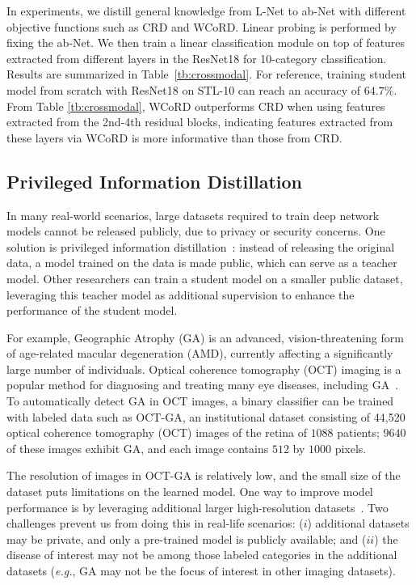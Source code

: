 \documentclass[final]{cvpr}
\theoremstyle{definition}
\begin{document}
In experiments, we distill general knowledge from L-Net to ab-Net with different objective functions such as CRD and WCoRD.
Linear probing is performed by fixing the ab-Net. We then train a linear classification module on top of features extracted from different layers in the ResNet18 for 10-category classification. 
Results are summarized in Table~\ref{tb:crossmodal}. For reference, training student model from scratch with ResNet18 on STL-10 can reach an accuracy of $64.7\%$. 
From Table \ref{tb:crossmodal}, WCoRD outperforms CRD when using features extracted from the 2nd-4th residual blocks, indicating features extracted from these layers via WCoRD is more informative than those from CRD.


\subsection{Privileged Information Distillation}

In many real-world scenarios, large datasets required to train deep network models cannot be released publicly, due to privacy or security concerns.
One solution is privileged information distillation~\cite{vapnik2009new}: instead of releasing the original data, a model trained on the data is made public, which can serve as a teacher model.
Other researchers can train a student model on a smaller public dataset, leveraging this teacher model as additional supervision to enhance the performance of the student model.








For example, Geographic Atrophy (GA) is an advanced, vision-threatening form of age-related macular degeneration (AMD), currently affecting a significantly large number of individuals.
Optical coherence tomography (OCT) imaging is a popular method for diagnosing and treating many eye diseases, including GA~\cite{boyer2017pathophysiology}. To automatically detect GA in OCT images, a binary classifier can be trained with labeled data such as OCT-GA, an institutional dataset consisting of 44,520 optical coherence tomography (OCT) images of the retina of $1088$ patients; $9640$ of these images exhibit GA, and each image contains $512$ by $1000$ pixels. 



The resolution of images in OCT-GA is relatively low, and the small size of the dataset puts limitations on the learned model. One way to improve model performance is by leveraging additional larger high-resolution datasets~\cite{sun2017revisiting}.
Two challenges prevent us from doing this in real-life scenarios: ($i$) additional datasets may be private, and only a pre-trained model is publicly available; and ($ii$) the disease of interest may not be among those labeled categories in the additional datasets (\emph{e.g.}, GA may not be the focus of interest in other imaging datasets). 
\end{document}
